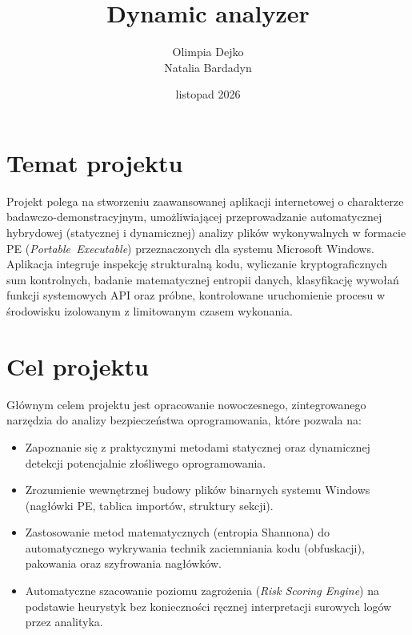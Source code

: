\documentclass{article}
\title{\textbf{Dynamic analyzer}}
\author{Olimpia Dejko \\ Natalia Bardadyn }
\date{listopad 2026}
\begin{document}
\maketitle

\tableofcontents
\newpage

\section{Temat projektu}
\label{sec:temat}
Projekt polega na stworzeniu zaawansowanej aplikacji internetowej o charakterze badawczo-demonstracyjnym, umożliwiającej przeprowadzanie automatycznej hybrydowej (statycznej i dynamicznej) analizy plików wykonywalnych w formacie PE (\textit{Portable~Executable}) przeznaczonych dla systemu Microsoft Windows. \\
Aplikacja integruje inspekcję strukturalną kodu, wyliczanie kryptograficznych sum kontrolnych, badanie matematycznej entropii danych, klasyfikację wywołań funkcji systemowych API oraz próbne, kontrolowane uruchomienie procesu w środowisku izolowanym z limitowanym czasem wykonania.

\section{Cel projektu}
\label{sec:cel}
Głównym celem projektu jest opracowanie nowoczesnego, zintegrowanego narzędzia do analizy bezpieczeństwa oprogramowania, które pozwala na:
\begin{itemize}
\item Zapoznanie się z praktycznymi metodami statycznej oraz dynamicznej detekcji potencjalnie złośliwego oprogramowania.
\item Zrozumienie wewnętrznej budowy plików binarnych systemu Windows (nagłówki PE, tablica importów, struktury sekcji).
\item Zastosowanie metod matematycznych (entropia Shannona) do automatycznego wykrywania technik zaciemniania kodu (obfuskacji), pakowania oraz szyfrowania nagłówków.
\item Automatyczne szacowanie poziomu zagrożenia (\textit{Risk Scoring Engine}) na podstawie heurystyk bez konieczności ręcznej interpretacji surowych logów przez analityka.
\end{itemize}
\end{document}
